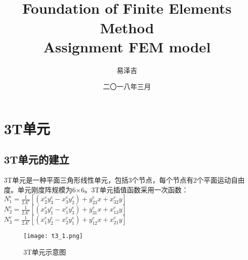 \documentclass[forprint]{WHUBachelor}
\begin{document}



\title{\\Foundation of Finite Elements Method\\Assignment FEM model}

\author{易泽吉}                            %



\date{二〇一八年三月}                    %


\maketitle
\frontmatter
{}              %

\mainmatter %

\section {3T单元}
\subsection {3T单元的建立}
3T单元是一种平面三角形线性单元，包括3个节点，每个节点有2个平面运动自由度。单元刚度阵规模为6×6。3T单元插值函数采用一次函数：
$ N_{1}^{e}=\frac{1}{2 A^{e}}\left[\left(x_{2}^{e} y_{3}^{e}-x_{3}^{e} y_{2}^{e}\right)+y_{23}^{e} x+x_{32}^{e} y\right] $
$ N_{2}^{e}=\frac{1}{2 A^{e}}\left[\left(x_{3}^{e} y_{1}^{e}-x_{1}^{e} y_{3}^{e}\right)+y_{31}^{e} x+x_{13}^{e} y\right] $
$ N_{3}^{e}=\frac{1}{2 A^{e}}\left[\left(x_{1}^{e} y_{2}^{e}-x_{2}^{e} y_{1}^{e}\right)+y_{12}^{e} x+x_{21}^{e} y\right] $

\begin{figure}[H]
\centering  
\texttt{[image: t3\_1.png]} 
\caption{3T单元示意图} 
\label{f1.1} 
\end{figure}
\end{document}
